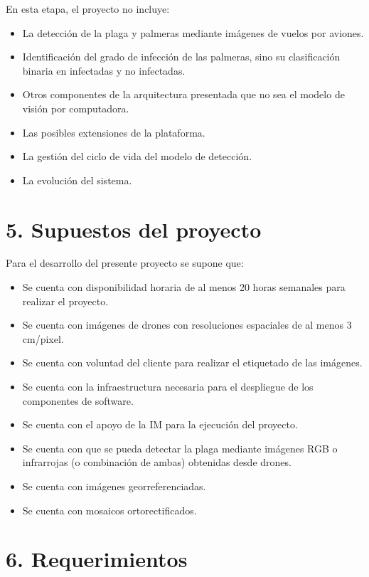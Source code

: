 \documentclass[
11pt, %
]{charter}
\begin{document}
En esta etapa, el proyecto no incluye:
\begin{itemize}
  \item La detección de la plaga y palmeras mediante imágenes de vuelos por aviones.
  \item Identificación del grado de infección de las palmeras, sino su clasificación binaria en infectadas y no infectadas.
  \item Otros componentes de la arquitectura presentada que no sea el modelo de visión por computadora.
  \item Las posibles extensiones de la plataforma.
  \item La gestión del ciclo de vida del modelo de detección.
  \item La evolución del sistema.
\end{itemize}

\section{5. Supuestos del proyecto}
\label{sec:supuestos}


Para el desarrollo del presente proyecto se supone que:

\begin{itemize}

  \item Se cuenta con disponibilidad horaria de al menos 20 horas semanales para realizar el proyecto.
  \item Se cuenta con imágenes de drones con resoluciones espaciales de al menos 3 cm/pixel.
  \item Se cuenta con voluntad del cliente para realizar el etiquetado de las imágenes.
  \item Se cuenta con la infraestructura necesaria para el despliegue de los componentes de software.
  \item Se cuenta con el apoyo de la IM para la ejecución del proyecto.
  \item Se cuenta con que se pueda detectar la plaga mediante imágenes RGB o infrarrojas (o combinación de ambas) obtenidas desde drones.
  \item Se cuenta con imágenes georreferenciadas.
  \item Se cuenta con mosaicos ortorectificados.

\end{itemize}

\section{6. Requerimientos}
\label{sec:requerimientos}
\end{document}

